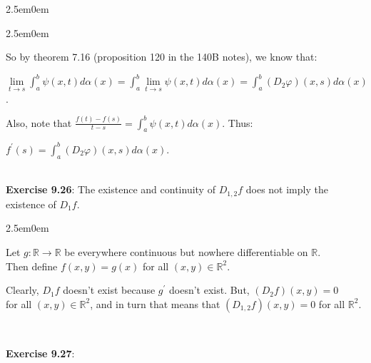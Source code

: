 \documentclass{book}
\newcommand{\exOne}{%
   \color{Purple}%
   \fontsize{14}{16}\selectfont%
}
\newcommand{\exTwo}{%
   \color{RedViolet}%
   \fontsize{13}{15}\selectfont%
}
\newenvironment{myIndent}{%
   \begin{adjustwidth}{2.5em}{0em}%
}{%
   \end{adjustwidth}%
}
\newcommand{\mySepTwo}[1][.]{%
   {\noindent\color{#1}{\rule{6.5in}{0.5mm}}}\\%
}
\newcommand{\retTwo}{\hfill\bigbreak}
\begin{document}
{\begin{myIndent}
{\begin{myIndent}
      So by theorem 7.16 (proposition 120 in the 140B notes), we know that:
      
      {\center $\lim\limits_{t\rightarrow s}\int_a^b\psi(x, t)d\alpha(x)  = \int_a^b \lim\limits_{t\rightarrow s}\psi(x, t)d\alpha(x) = \int_a^b (D_2\varphi)(x, s)d\alpha(x)$.\retTwo\par}

      Also, note that $\frac{f(t) - f(s)}{t - s} = \int_a^b \psi(x, t) d\alpha(x)$. Thus:
      
      {\center$f^\prime(s) = \int_a^b (D_2\varphi)(x, s)d\alpha(x)$.\retTwo\par}
   \end{myIndent}}
\end{myIndent}}

\exOne
\mySepTwo

\textbf{Exercise 9.26}: The existence and continuity of $D_{1,2}f$ does not imply the\\ existence of $D_1f$.

{\begin{myIndent}\exTwo
   Let $g: \mathbb{R} \longrightarrow \mathbb{R}$ be everywhere continuous but nowhere differentiable on $\mathbb{R}$.\\ Then define $f(x, y) = g(x)$ for all $(x, y) \in \mathbb{R}^2$.\retTwo

   Clearly, $D_1f$ doesn't exist because $g^\prime$ doesn't exist. But, $(D_2f)(x, y) = 0$\\ for all $(x, y) \in \mathbb{R}^2$, and in turn that means that $(D_{1,2}f)(x,y) = 0$ for all $\mathbb{R}^2$.\retTwo
\end{myIndent}}

\mySepTwo

\newpage

\textbf{Exercise 9.27}:
\end{document}
